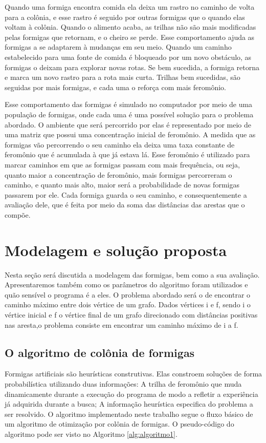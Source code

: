 \documentclass[a4paper, 12pt]{article}
\begin{document}
Quando uma formiga encontra comida ela deixa um rastro no caminho de volta para a colônia, e esse rastro é seguido por outras formigas que o quando elas voltam à colônia. Quando o alimento acaba, as trilhas não são mais modificadas pelas formigas que retornam, e o cheiro se perde. Esse comportamento ajuda as formigas a se adaptarem à mudanças em seu meio. Quando um caminho estabelecido para uma fonte de comida é bloqueado por um novo obstáculo, as formigas o deixam para explorar novas rotas. Se bem sucedida, a formiga retorna e marca um novo rastro para a rota mais curta. Trilhas bem sucedidas, são seguidas por mais formigas, e cada uma o reforça com mais feromônio.

Esse comportamento das formigas é simulado no computador por meio de uma população de formigas, onde cada uma é uma possível solução para o problema abordado. O ambiente que será percorrido por elas é representado por meio de uma matriz que possui uma concentração inicial de feromônio. A medida que as formigas vão percorrendo o seu caminho ela deixa uma taxa constante de feromônio que é acumulada à que já estava lá. Esse feromônio é utilizado para marcar caminhos em que as formigas passam com mais frequência, ou seja, quanto maior a concentração de feromônio, mais formigas percorreram o caminho, e quanto mais alto, maior será a probabilidade de novas formigas passarem por ele. Cada formiga guarda o seu caminho, e consequentemente a avaliação dele, que é feita por meio da soma das distâncias das arestas que o compõe.

\section{Modelagem e solução proposta}

Nesta seção será discutida a modelagem das formigas, bem como a sua avaliação. Apresentaremos também como os parâmetros do algoritmo foram utilizados e quão sensível o programa é a eles.
O problema abordado será o de encontrar o caminho máximo entre dois vértice de um grafo. Dados vértices i e f, sendo i o vértice inicial e f o vértice final de um grafo direcionado com distâncias positivas nas aresta,o problema consiste em encontrar um caminho máximo de i a f.

\subsection{O algoritmo de colônia de formigas}
 Formigas artificiais são heurísticas construtivas. Elas constroem soluções de forma probabilística utilizando duas informações: A trilha de feromônio que muda dinamicamente durante a execução do programa de modo a refletir a experiência já adquirida durante a busca; A informação heurística especifica do problema a ser resolvido. O algoritmo implementado neste trabalho segue o fluxo básico de um algoritmo de otimização por colônia de formigas. O pseudo-código do algoritmo pode ser visto no Algoritmo \ref{alg:algoritmo1}.
\end{document}
